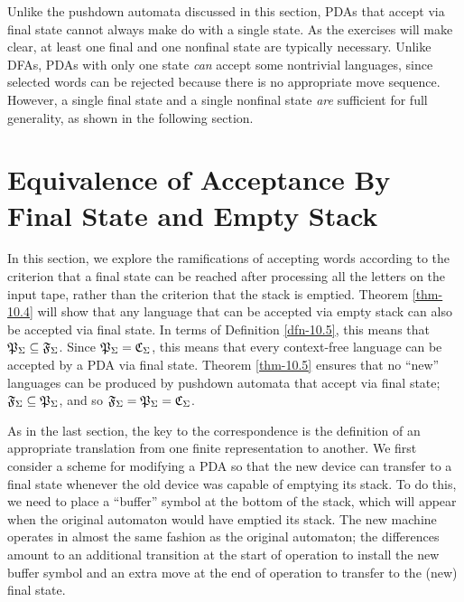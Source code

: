 Unlike the pushdown automata discussed in this section, PDAs that accept via
final state cannot always make do with a single state. As the exercises will
make clear, at least one final and one nonfinal state are typically necessary. Unlike
DFAs, PDAs with only one state \emph{can} accept some nontrivial languages, since
selected words can be rejected because there is no appropriate move sequence.
However, a single final state and a single nonfinal state
\emph{are} sufficient for full generality, as
shown in the following section.

\section{Equivalence of Acceptance By Final State and Empty Stack}\label{sec-10.3}

In this section, we explore the ramifications of accepting words according to
the criterion that a final state can be reached after processing all the letters
on the input tape, rather than the criterion that the stack is emptied. Theorem
\ref{thm-10.4} will show that any language that can be accepted via empty stack can also
be accepted via final state. In terms of Definition \ref{dfn-10.5}, this means that
$\mathfrak{P}_\Sigma\subseteq\mathfrak{F}_\Sigma$. Since $\mathfrak{P}_\Sigma=\mathfrak{C}_\Sigma$, this means that every context-free
language can be accepted by a PDA via final state. Theorem \ref{thm-10.5} ensures that no
``new'' languages can be produced by pushdown automata that accept via final
state; $\mathfrak{F}_\Sigma\subseteq\mathfrak{P}_\Sigma$, and so $\mathfrak{F}_\Sigma=\mathfrak{P}_\Sigma=\mathfrak{C}_\Sigma$.

As in the last section, the key to the correspondence is the definition of an
appropriate translation from one finite representation to another. We first
consider a scheme for modifying a PDA so that the new device can transfer to a
final state whenever the old device was capable of emptying its stack. To do
this, we need to place a ``buffer'' symbol at the bottom of the stack, which will
appear when the original automaton would have emptied its stack. The new machine
operates in almost the same fashion as the original automaton; the differences
amount to an additional transition at the start of operation to install the new
buffer symbol and an extra move at the end of operation to transfer to the (new)
final state.

